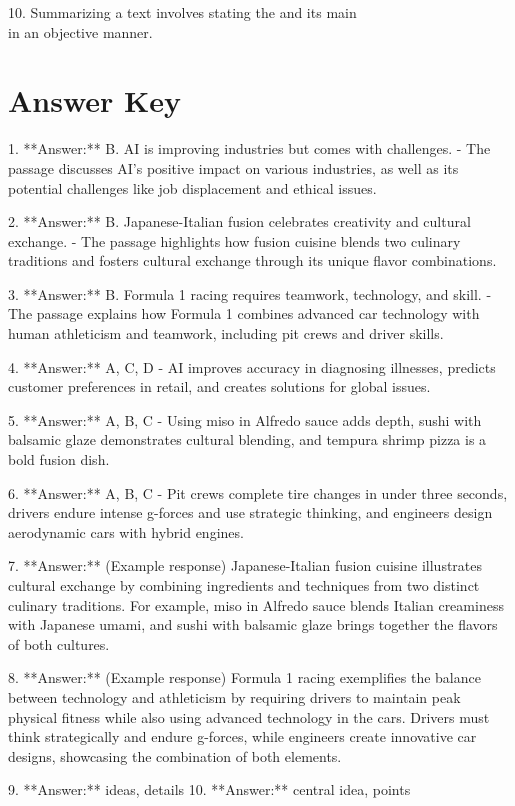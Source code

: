 \documentclass[12pt]{article}
\begin{document}
10. Summarizing a text involves stating the \underline{\hspace{4cm}} and its main\\ \underline{\hspace{4cm}} in an objective manner.  
\vspace{2cm}
\newpage

\section*{Answer Key}

1. **Answer:** B. AI is improving industries but comes with challenges.  
   - The passage discusses AI's positive impact on various industries, as well as its potential challenges like job displacement and ethical issues.

2. **Answer:** B. Japanese-Italian fusion celebrates creativity and cultural exchange.  
   - The passage highlights how fusion cuisine blends two culinary traditions and fosters cultural exchange through its unique flavor combinations.

3. **Answer:** B. Formula 1 racing requires teamwork, technology, and skill.  
   - The passage explains how Formula 1 combines advanced car technology with human athleticism and teamwork, including pit crews and driver skills.

4. **Answer:** A, C, D  
   - AI improves accuracy in diagnosing illnesses, predicts customer preferences in retail, and creates solutions for global issues. 

5. **Answer:** A, B, C  
   - Using miso in Alfredo sauce adds depth, sushi with balsamic glaze demonstrates cultural blending, and tempura shrimp pizza is a bold fusion dish.

6. **Answer:** A, B, C  
   - Pit crews complete tire changes in under three seconds, drivers endure intense g-forces and use strategic thinking, and engineers design aerodynamic cars with hybrid engines.

7. **Answer:** (Example response) Japanese-Italian fusion cuisine illustrates cultural exchange by combining ingredients and techniques from two distinct culinary traditions. For example, miso in Alfredo sauce blends Italian creaminess with Japanese umami, and sushi with balsamic glaze brings together the flavors of both cultures.

8. **Answer:** (Example response) Formula 1 racing exemplifies the balance between technology and athleticism by requiring drivers to maintain peak physical fitness while also using advanced technology in the cars. Drivers must think strategically and endure g-forces, while engineers create innovative car designs, showcasing the combination of both elements.

9. **Answer:** ideas, details  
10. **Answer:** central idea, points  
\end{document}
